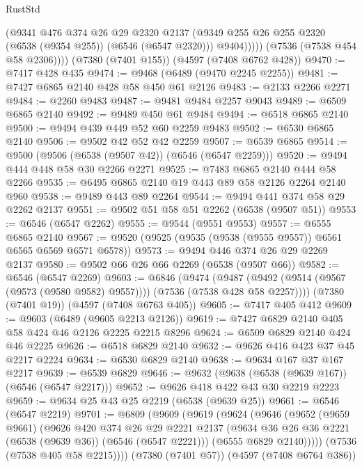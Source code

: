 \begin{lexlean}{RustStd}
\begin{coremodule}
                (@9341
                  @476
                  @374
                  @26
                  @29
                  @2320
                  @2137
                  (@9349 @255 @26 @255 @2320 (@6538 (@9354 @255)) (@6546 (@6547 @2320)))
                  @9404)))))
        (@7536 (@7538 @454 @58 @2306))))
    (@7380 (@7401 @155))
    (@4597 (@7408 @6762 @428))
@9470 := @7417 @428 @435
@9474 := @9468 (@6489 (@9470 @2245 @2255))
@9481 := @7427 @6865 @2140 @428 @58 @450 @61 @2126
@9483 := @2133 @2266 @2271
@9484 := @2260 @9483
@9487 := @9481 @9484 @2257 @9043
@9489 := @6509 @6865 @2140
@9492 := @9489 @450 @61 @9484
@9494 := @6518 @6865 @2140
@9500 := @9494 @439 @449 @52 @60 @2259 @9483
@9502 := @6530 @6865 @2140
@9506 := @9502 @42 @52 @42 @2259
@9507 := @6539 @6865
@9514 := @9500 (@9506 (@6538 (@9507 @42)) (@6546 (@6547 @2259)))
@9520 := @9494 @444 @448 @58 @30 @2266 @2271
@9525 := @7483 @6865 @2140 @444 @58 @2266
@9535 := @6495 @6865 @2140 @19 @443 @89 @58 @2126 @2264 @2140 @960
@9538 := @9489 @443 @89 @2264
@9544 := @9494 @441 @374 @58 @29 @2262 @2137
@9551 := @9502 @51 @58 @51 @2262 (@6538 (@9507 @51))
@9553 := @6546 (@6547 @2262)
@9555 := @9544 (@9551 @9553)
@9557 := @6555 @6865 @2140
@9567 := @9520 (@9525 (@9535 (@9538 (@9555 @9557)) @6561 @6565 @6569 @6571 @6578))
@9573 := @9494 @446 @374 @26 @29 @2269 @2137
@9580 := @9502 @66 @26 @66 @2269 (@6538 (@9507 @66))
@9582 := @6546 (@6547 @2269)
@9603 := @6846
    (@9474
      (@9487 (@9492 (@9514 (@9567 (@9573 (@9580 @9582) @9557)))) (@7536 (@7538 @428 @58 @2257))))
    (@7380 (@7401 @19))
    (@4597 (@7408 @6763 @405))
@9605 := @7417 @405 @412
@9609 := @9603 (@6489 (@9605 @2213 @2126))
@9619 := @7427 @6829 @2140 @405 @58 @424 @46 @2126 @2225 @2215 @8296
@9624 := @6509 @6829 @2140 @424 @46 @2225
@9626 := @6518 @6829 @2140
@9632 := @9626 @416 @423 @37 @45 @2217 @2224
@9634 := @6530 @6829 @2140
@9638 := @9634 @167 @37 @167 @2217
@9639 := @6539 @6829
@9646 := @9632 (@9638 (@6538 (@9639 @167)) (@6546 (@6547 @2217)))
@9652 := @9626 @418 @422 @43 @30 @2219 @2223
@9659 := @9634 @25 @43 @25 @2219 (@6538 (@9639 @25))
@9661 := @6546 (@6547 @2219)
@9701 := @6809
    (@9609
      (@9619
        (@9624
          (@9646
            (@9652
              (@9659 @9661)
              (@9626
                @420
                @374
                @26
                @29
                @2221
                @2137
                (@9634 @36 @26 @36 @2221 (@6538 (@9639 @36)) (@6546 (@6547 @2221)))
                (@6555 @6829 @2140)))))
        (@7536 (@7538 @405 @58 @2215))))
    (@7380 (@7401 @57))
    (@4597 (@7408 @6764 @386))

\end{coremodule}
\end{lexlean}
